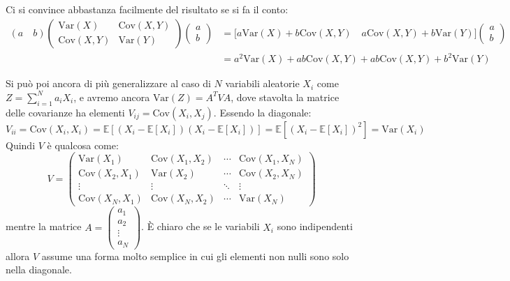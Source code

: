\documentclass[openany,a4paper,12pt]{book}
\theoremstyle{remark}
\begin{document}
\begin{nota}
Ci si convince abbastanza facilmente del risultato se si fa il conto:
\begin{align*}
    (a \quad b) \begin{pmatrix} \text{Var}(X) & \text{Cov}(X,Y) \\ \text{Cov}(X,Y) & \text{Var}(Y) \end{pmatrix} \begin{pmatrix} a \\ b \end{pmatrix} 
    &= \big[ a\text{Var}(X) + b\text{Cov}(X,Y) \quad a\text{Cov}(X,Y) + b\text{Var}(Y) \big] \begin{pmatrix} a \\ b \end{pmatrix} \\
    &= a^2 \text{Var}(X) + ab \text{Cov}(X,Y) + ab \text{Cov}(X,Y) + b^2 \text{Var}(Y)
\end{align*}

Si può poi ancora di più generalizzare al caso di $N$ variabili aleatorie $X_i$ come $Z = \sum_{i=1}^{N} a_i X_i$, e avremo ancora $\text{Var}(Z) = A^T V A$, dove stavolta la matrice delle covarianze ha elementi $V_{ij} = \text{Cov}(X_i, X_j)$. Essendo la diagonale:
\begin{equation*}
    V_{ii} = \text{Cov}(X_i, X_i) = \mathbb{E}\left[ (X_i - \mathbb{E}[X_i])(X_i - \mathbb{E}[X_i]) \right] = \mathbb{E}\left[ (X_i - \mathbb{E}[X_i])^2 \right] = \text{Var}(X_i)
\end{equation*}
Quindi $V$ è qualcosa come:
\begin{equation}
    V = \begin{pmatrix}
    \text{Var}(X_1) & \text{Cov}(X_1, X_2) & \cdots & \text{Cov}(X_1, X_N) \\
    \text{Cov}(X_2, X_1) & \text{Var}(X_2) & \cdots & \text{Cov}(X_2, X_N) \\
    \vdots & \vdots & \ddots & \vdots \\
    \text{Cov}(X_N, X_1) & \text{Cov}(X_N, X_2) & \cdots & \text{Var}(X_N)
    \end{pmatrix}
\end{equation}
mentre la matrice $A = \begin{pmatrix} a_1 \\ a_2 \\ \vdots \\ a_N \end{pmatrix}$.
È chiaro che se le variabili $X_i$ sono indipendenti allora $V$ assume una forma molto semplice in cui gli elementi non nulli sono solo nella diagonale.
\end{nota}
\end{document}
